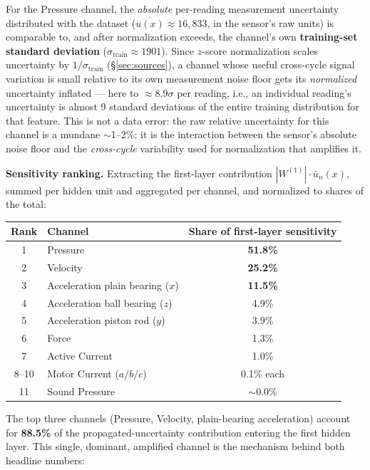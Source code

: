 \documentclass[11pt]{article}
\begin{document}
For the Pressure channel, the \emph{absolute} per-reading measurement
uncertainty distributed with the dataset ($\overline{u(x)} \approx
16{,}833$, in the sensor's raw units) is comparable to, and after
normalization exceeds, the channel's own \textbf{training-set standard
deviation} ($\sigma_{\text{train}} \approx 1901$). Since $z$-score
normalization scales uncertainty by $1/\sigma_{\text{train}}$
(\S\ref{sec:sources}), a channel whose useful cross-cycle signal variation
is small relative to its own measurement noise floor gets its
\emph{normalized} uncertainty inflated --- here to $\approx 8.9\sigma$ per
reading, i.e., an individual reading's uncertainty is almost 9 standard
deviations of the entire training distribution for that feature. This is
not a data error: the raw relative uncertainty for this channel is a
mundane $\sim$1--2\%; it is the interaction between the sensor's absolute
noise floor and the \emph{cross-cycle} variability used for normalization
that amplifies it.

\textbf{Sensitivity ranking.} Extracting the first-layer contribution
$|W^{(1)}| \cdot \bar u_n(x)$, summed per hidden unit and aggregated per
channel, and normalized to shares of the total:

\begin{center}
\begin{tabular}{@{}clc@{}}
\toprule
Rank & Channel & Share of first-layer sensitivity \\
\midrule
1 & Pressure & \textbf{51.8\%} \\
2 & Velocity & \textbf{25.2\%} \\
3 & Acceleration plain bearing ($x$) & \textbf{11.5\%} \\
4 & Acceleration ball bearing ($z$) & 4.9\% \\
5 & Acceleration piston rod ($y$) & 3.9\% \\
6 & Force & 1.3\% \\
7 & Active Current & 1.0\% \\
8--10 & Motor Current ($a$/$b$/$c$) & 0.1\% each \\
11 & Sound Pressure & $\sim$0.0\% \\
\bottomrule
\end{tabular}
\end{center}

The top three channels (Pressure, Velocity, plain-bearing acceleration) account for
\textbf{88.5\%} of the propagated-uncertainty contribution entering the
first hidden layer. This single, dominant, amplified channel is the
mechanism behind both headline numbers:
\end{document}
